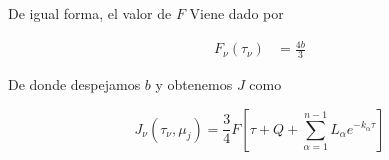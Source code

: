 \documentclass[10pt,spanish,a4paper]{practice}
\begin{document}
\begin{problem}
\begin{solution}
            De igual forma, el valor de $F$ Viene dado por

            \begin{align*}
                F_\nu\left(\tau_\nu\right) &= \frac{4b}{3}
            \end{align*}

            De donde despejamos $b$ y obtenemos $J$ como

            \begin{equation*}
                J_{\nu}\left(\tau_{\nu}, \mu_j\right) = \frac{3}{4} F \left[\tau + Q + \sum_{\alpha=1}^{n-1}L_\alpha e^{-k_\alpha\tau}\right]
            \end{equation*}
        \end{solution}
    \end{problem}
\end{document}
